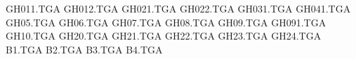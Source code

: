 GH011.TGA
GH012.TGA
GH021.TGA
GH022.TGA
GH031.TGA
GH041.TGA
GH05.TGA
GH06.TGA
GH07.TGA
GH08.TGA
GH09.TGA
GH091.TGA
GH10.TGA
GH20.TGA
GH21.TGA
GH22.TGA
GH23.TGA
GH24.TGA
B1.TGA
B2.TGA
B3.TGA
B4.TGA
